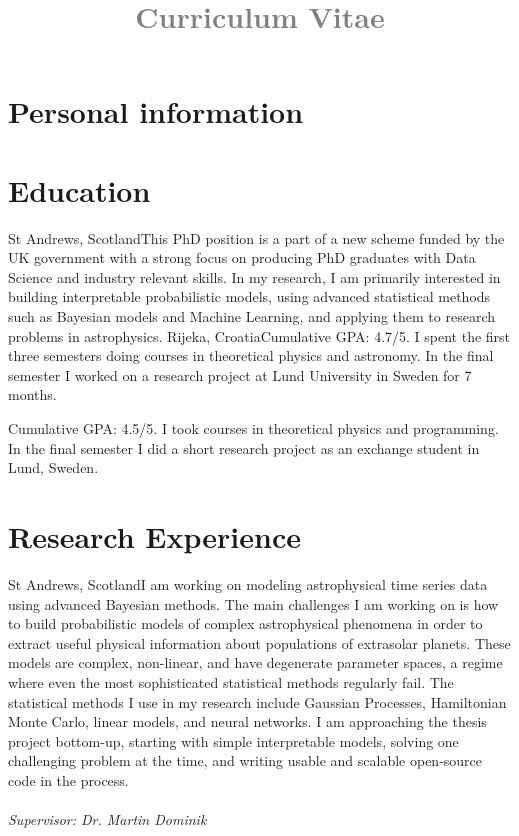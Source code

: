 \documentclass[11pt,a4paper,roman]{moderncv}
\title{\textcolor{gray}{ Curriculum Vitae}}
\begin{document}
\makecvtitle
\section{Personal information}

\section{Education}
{St Andrews, Scotland}{}{This PhD position is a part of a new scheme funded by the UK government
with a strong focus on producing PhD graduates with Data Science and industry relevant skills. 
In my research, I am primarily interested in building interpretable probabilistic models, 
using advanced statistical methods such as Bayesian models and Machine Learning, 
and applying them to research problems in astrophysics.}
{Rijeka, Croatia}{}{Cumulative GPA: 4.7/5. I spent the first three semesters 
doing courses in theoretical 
physics and astronomy. In the final semester I worked on 
a research project at Lund University in Sweden for 7 months.}

{Cumulative GPA: 4.5/5. I took courses in theoretical physics and programming. In the final 
semester I did a short research project as an exchange student in Lund, Sweden.}

\section{Research Experience}
{St Andrews, Scotland}{}{I am working on modeling astrophysical time series data 
using advanced Bayesian methods.
The main challenges I am working on is how to build 
probabilistic models of complex astrophysical
phenomena in order to extract useful physical information 
about populations of extrasolar planets.
These models are complex, non-linear, and have degenerate parameter spaces, a regime where
even the most sophisticated statistical methods regularly fail. 
The statistical methods I use in my research include Gaussian Processes, Hamiltonian Monte Carlo,
linear models, and neural networks.
I am approaching the thesis project bottom-up, starting with simple interpretable models, solving 
one challenging problem at the time, and writing usable and scalable open-source code 
in the process. 
\\\\
\emph{Supervisor: Dr. Martin Dominik}}
\end{document}
